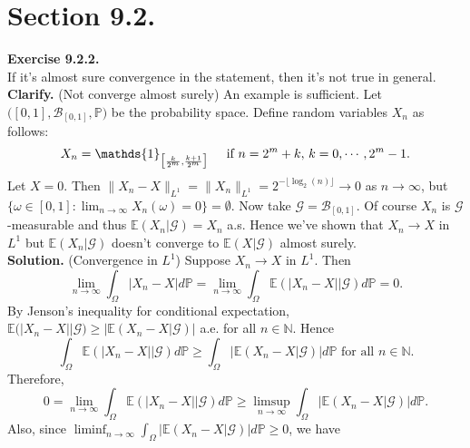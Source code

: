 \documentclass[12pt]{extarticle}
\begin{document}
\section*{Section 9.2.}
\textbf{Exercise 9.2.2.} \\
If it's almost sure convergence in the statement, then it's not true in general.\\
\textbf{Clarify.} (Not converge almost surely) An example is sufficient. Let $\big([0,1],\mathcal{B}_{[0,1]},\mathbb{P}\big)$ be the probability space. Define random variables $X_n$ as follows:
\begin{equation*}
X_n=\mathds{1}_{\big[\frac{k}{2^m},\frac{k+1}{2^m}\big]}\hspace{5mm}\text{if }n=2^m+k,\,k=0,\cdots,2^m-1.
\end{equation*}
Let $X=0$. Then $\|X_n-X\|_{L^1}=\|X_n\|_{L^1}=2^{-\lfloor\log_2(n)\rfloor}\rightarrow 0$ as $n\rightarrow\infty$, but $\{\omega\in[0,1]:\lim_{n\rightarrow\infty}X_n(\omega)= 0\}=\emptyset$. Now take $\mathcal{G}=\mathcal{B}_{[0,1]}$. Of course $X_n$ is $\mathcal{G}$-measurable and thus $\mathbb{E}(X_n|\mathcal{G})=X_n$ a.s. Hence we've shown that $X_n\rightarrow X$ in $L^1$ but $\mathbb{E}(X_n|\mathcal{G})$ doesn't converge to $\mathbb{E}(X|\mathcal{G})$ almost surely.
\\
\textbf{Solution.} (Convergence in $L^1$) Suppose $X_n\rightarrow X$ in $L^1$. Then
\begin{equation*}
\lim_{n\rightarrow\infty}\int_\Omega|X_n-X|d\mathbb{P}=\lim_{n\rightarrow\infty}\int_\Omega\mathbb{E}\left(|X_n-X| | \mathcal{G}\right)d\mathbb{P}=0.
\end{equation*}
By Jenson's inequality for conditional expectation, $\mathbb{E}\big(|X_n-X||\mathcal{G}\big)\geq \big|\mathbb{E}\left(X_n-X|\mathcal{G}\right)\big|$ a.e. for all $n\in\mathbb{N}$. Hence
\begin{equation*}
\int_\Omega\mathbb{E}\left(|X_n-X| |  \mathcal{G}\right)d\mathbb{P}\geq\int_\Omega\big|\mathbb{E}\left(X_n-X | \mathcal{G}\right)\big|d\mathbb{P}\text{ for all } n\in\mathbb{N}.
\end{equation*}
Therefore,
\begin{equation*}
0=\lim_{n\rightarrow\infty}\int_\Omega\mathbb{E}\left(|X_n-X| | \mathcal{G}\right)d\mathbb{P}\geq\limsup_{n\rightarrow\infty}\int_\Omega\big|\mathbb{E}\left(X_n-X | \mathcal{G}\right)\big|d\mathbb{P}.
\end{equation*}
Also, since $\liminf_{n\rightarrow\infty}\int_\Omega\big|\mathbb{E}\left(X_n-X | \mathcal{G}\right)\big|d\mathbb{P}\geq 0$, we have
\end{document}
